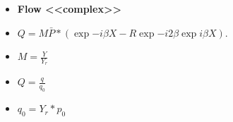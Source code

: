 \documentclass[10pt]{beamer}
\theoremstyle{remark}
\theoremstyle{definition}
\begin{document}
\begin{frame}[allowframebreaks]
\begin{itemize}
			
		\end{itemize}
		
		\framebreak
		
		\begin{itemize}
			\item \textbf{Flow <<complex>>}
			\item $ Q = M \bar{P} * (\exp{-i\beta X} - R\exp{-i2\beta}\exp{i\beta X})$.
			\item $ M = \frac{Y}{Y_r}$
			\item $ Q = \frac{q}{q_0}$
			\item $ q_0 = Y_r * p_0$
			
		\end{itemize}
		
	\end{frame}
	
	
	
\end{document}
